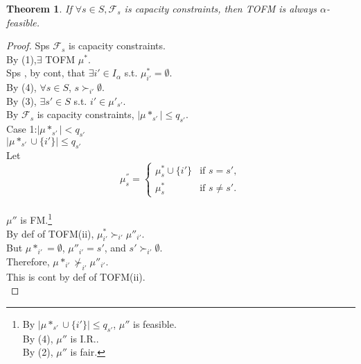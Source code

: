 \documentclass[a4j,10pt]{jsarticle}
\theoremstyle{definition}
\theoremstyle{remark}
\theoremstyle{plain}
\newtheorem{theorem}{Theorem}
\begin{document}
\begin{tcolorbox}
  \begin{theorem}
    If $\forall s \in S, \mathcal{F}_s$ is capacity constraints, then TOFM is always $\alpha$-feasible.
  \end{theorem}
  \begin{proof}
    Sps $\mathcal{F}_s$ is capacity constraints.\\
    By (1),$\exists$ TOFM $\mu^*$.\\
    Sps , by cont, that $\exists i' \in I_\alpha$ s.t. $\mu^*_{i'} = \emptyset$.\\
    By (4), $\forall s \in S$, $s \succ_{i'} \emptyset$.\\
    By (3), $\exists s' \in S$ s.t. $i' \in \mu'_{s'}$.\\
    By $\mathcal{F}_s$ is capacity constraints, $|\mu*_{s'}| \leq q_{s'}$.\\
    Case 1:$|\mu*_{s'}| < q_{s'}$\\
    $|\mu*_{s'} \cup \{i'\}| \leq q_{s'}$\\
    Let \[
        \mu^{''}_s =
        \begin{cases}
        \mu^*_s \cup \{i'\} & \text{if } s = s', \\
        \mu^*_s & \text{if } s \neq s'.
        \end{cases}
        \]\\
    $\mu''$ is FM.\footnote{By $|\mu*_{s'} \cup \{i'\}| \leq q_{s'}$, $\mu''$ is feasible.\\By (4), $\mu''$ is I.R..\\ By (2), $\mu''$ is fair.}\\
    By def of TOFM(ii), $\mu^*_{i'} \succ_{i'} \mu''_{i'}$.\\
    But $\mu*_{i'} = \emptyset $, $\mu''_{i'} = s'$, and $s' \succ_{i'} \emptyset$.\\
    Therefore, $\mu*_{i'} \nsucc_{i'} \mu''_{i'}$.\\
    This is cont by def of TOFM(ii).\\


\end{proof}
\end{tcolorbox}
\end{document}

